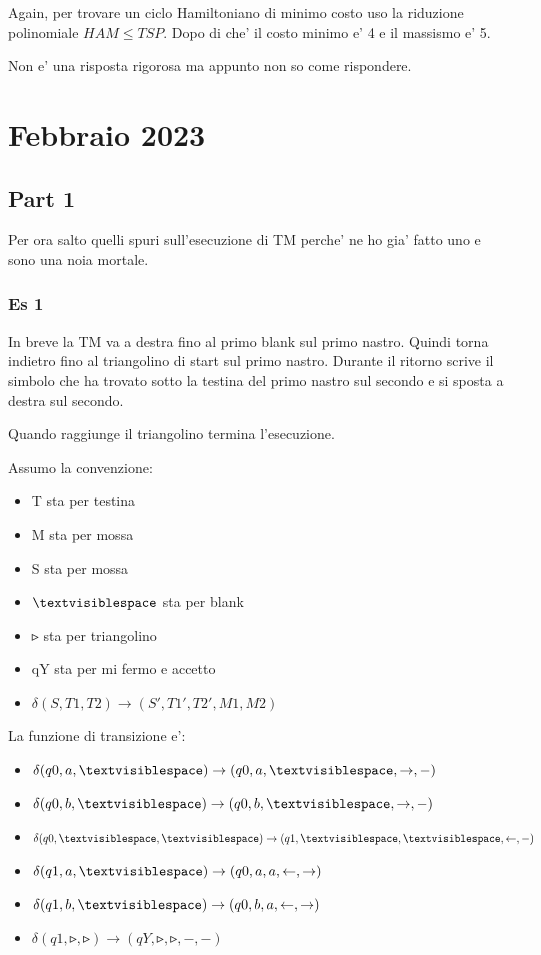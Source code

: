 \documentclass[a4paper,10pt,oneside]{book}
\begin{document}
Again, per trovare un ciclo Hamiltoniano di minimo costo uso la riduzione polinomiale $HAM \leq TSP$. Dopo di che' il costo minimo e' 4 e il massismo e' 5.

Non e' una risposta rigorosa ma appunto non so come rispondere.

\chapter{Febbraio 2023}

\section{Part 1}

Per ora salto quelli spuri sull'esecuzione di TM perche' ne ho gia' fatto uno e sono una noia mortale.

\subsection{Es 1}

In breve la TM va a destra fino al primo blank sul primo nastro. Quindi torna indietro fino al triangolino di start sul primo nastro. Durante il ritorno scrive il simbolo che ha trovato sotto la testina del primo nastro sul secondo e si sposta a destra sul secondo.

Quando raggiunge il triangolino termina l'esecuzione.

Assumo la convenzione:
\label{tm:convenzione}
\begin{itemize}
    \item T sta per testina
    \item M sta per mossa
    \item S sta per mossa
    \item $\textvisiblespace $ sta per blank
    \item $\smalltriangleright$ sta per triangolino
    \item qY sta per mi fermo e accetto
    \item $\delta(S, T1, T2) \rightarrow (S', T1', T2', M1, M2)$
\end{itemize}

La funzione di transizione e':

\begin{itemize}
    \item $\delta(q0, a, \textvisiblespace ) \rightarrow (q0, a, \textvisiblespace , \rightarrow, -)$
    \item $\delta(q0, b, \textvisiblespace ) \rightarrow (q0, b, \textvisiblespace , \rightarrow, -)$
    \item $\delta(q0, \textvisiblespace , \textvisiblespace ) \rightarrow (q1, \textvisiblespace , \textvisiblespace , \leftarrow, -)$
    \item $\delta(q1, a, \textvisiblespace ) \rightarrow (q0, a, a, \leftarrow, \rightarrow)$
    \item $\delta(q1, b, \textvisiblespace ) \rightarrow (q0, b, a, \leftarrow, \rightarrow)$
    \item $\delta(q1, \smalltriangleright, \smalltriangleright) \rightarrow (qY, \smalltriangleright, \smalltriangleright, -, -)$
\end{itemize}
\end{document}
